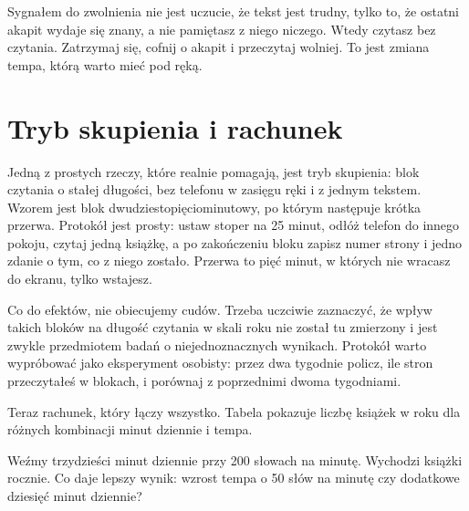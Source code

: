 \begin{uwaga}
Sygnałem do zwolnienia nie jest uczucie, że tekst jest trudny, tylko to, że ostatni akapit wydaje się znany, a nie pamiętasz z niego niczego. Wtedy czytasz bez czytania. Zatrzymaj się, cofnij o akapit i przeczytaj wolniej. To jest zmiana tempa, którą warto mieć pod ręką.
\end{uwaga}

\section{Tryb skupienia i rachunek}

Jedną z prostych rzeczy, które realnie pomagają, jest tryb skupienia: blok czytania o stałej długości, bez telefonu w zasięgu ręki i z jednym tekstem. Wzorem jest blok dwudziestopięciominutowy, po którym następuje krótka przerwa. Protokół jest prosty: ustaw stoper na 25 minut, odłóż telefon do innego pokoju, czytaj jedną książkę, a po zakończeniu bloku zapisz numer strony i jedno zdanie o tym, co z niego zostało. Przerwa to pięć minut, w których nie wracasz do ekranu, tylko wstajesz.

Co do efektów, nie obiecujemy cudów. Trzeba uczciwie zaznaczyć, że wpływ takich bloków na długość czytania w skali roku nie został tu zmierzony i jest zwykle przedmiotem badań o niejednoznacznych wynikach. Protokół warto wypróbować jako eksperyment osobisty: przez dwa tygodnie policz, ile stron przeczytałeś w blokach, i porównaj z poprzednimi dwoma tygodniami.

Teraz rachunek, który łączy wszystko. Tabela pokazuje liczbę książek w roku dla różnych kombinacji minut dziennie i tempa.


Weźmy trzydzieści minut dziennie przy 200 słowach na minutę. Wychodzi  książki rocznie. Co daje lepszy wynik: wzrost tempa o 50 słów na minutę czy dodatkowe dziesięć minut dziennie?

